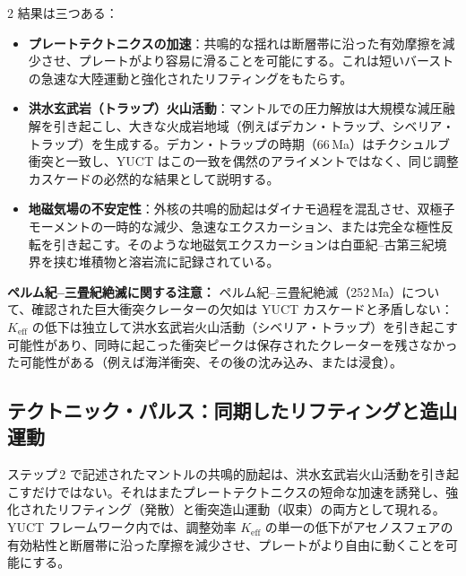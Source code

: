\documentclass[12pt,a4paper]{article}
\begin{document}
\begin{multicols}{2}
		結果は三つある：
		\begin{itemize}
			\item \textbf{プレートテクトニクスの加速}：共鳴的な揺れは断層帯に沿った有効摩擦を減少させ、プレートがより容易に滑ることを可能にする。これは短いバーストの急速な大陸運動と強化されたリフティングをもたらす。
			\item \textbf{洪水玄武岩（トラップ）火山活動}：マントルでの圧力解放は大規模な減圧融解を引き起こし、大きな火成岩地域（例えばデカン・トラップ、シベリア・トラップ）を生成する。デカン・トラップの時期（66 Ma）はチクシュルブ衝突と一致し、YUCT はこの一致を偶然のアライメントではなく、同じ調整カスケードの必然的な結果として説明する。
			\item \textbf{地磁気場の不安定性}：外核の共鳴的励起はダイナモ過程を混乱させ、双極子モーメントの一時的な減少、急速なエクスカーション、または完全な極性反転を引き起こす。そのような地磁気エクスカーションは白亜紀–古第三紀境界を挟む堆積物と溶岩流に記録されている。
		\end{itemize}
		
		\noindent
		\textbf{ペルム紀–三畳紀絶滅に関する注意：} ペルム紀–三畳紀絶滅（252 Ma）について、確認された巨大衝突クレーターの欠如は YUCT カスケードと矛盾しない：\(K_{\mathrm{eff}}\) の低下は独立して洪水玄武岩火山活動（シベリア・トラップ）を引き起こす可能性があり、同時に起こった衝突ピークは保存されたクレーターを残さなかった可能性がある（例えば海洋衝突、その後の沈み込み、または浸食）。
		
		\subsection{テクトニック・パルス：同期したリフティングと造山運動}
		ステップ 2 で記述されたマントルの共鳴的励起は、洪水玄武岩火山活動を引き起こすだけではない。それはまたプレートテクトニクスの短命な加速を誘発し、強化されたリフティング（発散）と衝突造山運動（収束）の両方として現れる。YUCT フレームワーク内では、調整効率 \(K_{\mathrm{eff}}\) の単一の低下がアセノスフェアの有効粘性と断層帯に沿った摩擦を減少させ、プレートがより自由に動くことを可能にする。
		

\end{multicols}
\end{document}
